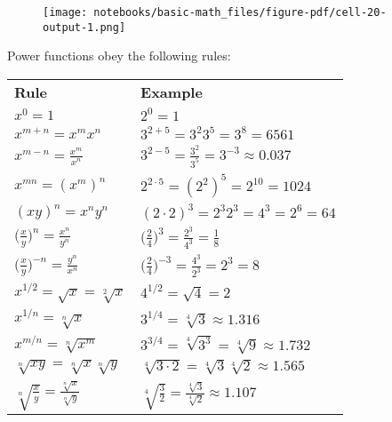 \documentclass[
  letterpaper,
  DIV=11,
  numbers=noendperiod]{scrreprt}
\newenvironment{Shaded}{\begin{snugshade}}{\end{snugshade}}
\newcommand{\DecValTok}[1]{\textcolor[rgb]{0.68,0.00,0.00}{#1}}
\newcommand{\FloatTok}[1]{\textcolor[rgb]{0.68,0.00,0.00}{#1}}
\newcommand{\KeywordTok}[1]{\textcolor[rgb]{0.00,0.23,0.31}{#1}}
\newcommand{\NormalTok}[1]{\textcolor[rgb]{0.00,0.23,0.31}{#1}}
\newcommand{\OperatorTok}[1]{\textcolor[rgb]{0.37,0.37,0.37}{#1}}
\newcommand{\SpecialCharTok}[1]{\textcolor[rgb]{0.37,0.37,0.37}{#1}}
\newcommand{\StringTok}[1]{\textcolor[rgb]{0.13,0.47,0.30}{#1}}
\begin{document}
\begin{Shaded}
\end{Shaded}

\begin{figure}[H]

{\centering \texttt{[image: notebooks/basic-math\_files/figure-pdf/cell-20-output-1.png]}

}

\end{figure}

Power functions obey the following rules:

\begin{longtable}[]{@{}
  >{\raggedright\arraybackslash}p{}
  >{\raggedright\arraybackslash}p{}@{}}
\toprule()
\endhead
\textbf{Rule} & \textbf{Example} \\
\(x^0 = 1\) & \(2^0 = 1\) \\
\(x^{m+n} = x^m x^n\) & \(3^{2+5} = 3^2 3^5 = 3^8 = 6561\) \\
\(x^{m-n} = \frac{x^m}{x^n}\) &
\(3^{2-5} = \frac{3^2}{3^5} = 3^{-3} \approx 0.037\) \\
\(x^{mn} = (x^m)^n\) & \(2^{2 \cdot 5} = (2^2)^5 = 2^{10} = 1024\) \\
\((xy)^n = x^n y^n\) & \((2 \cdot 2)^3 = 2^3 2^3 = 4^3 = 2^6 = 64\) \\
\(\big(\frac{x}{y}\big)^n = \frac{x^n}{y^n}\) &
\(\big(\frac{2}{4}\big)^3 = \frac{2^3}{4^3} = \frac{1}{8}\) \\
\(\big(\frac{x}{y}\big)^{-n} = \frac{y^n}{x^n}\) &
\(\big(\frac{2}{4}\big)^{-3} = \frac{4^3}{2^3} = 2^3 = 8\) \\
\(x^{1/2} = \sqrt{x} = \sqrt[2]{x}\) & \(4^{1/2} = \sqrt{4} = 2\) \\
\(x^{1/n} = \sqrt[n]{x}\) & \(3^{1/4} = \sqrt[4]{3} \approx 1.316\) \\
\(x^{m/n} = \sqrt[n]{x^m}\) &
\(3^{3/4} = \sqrt[4]{3^3} = \sqrt[4]{9} \approx 1.732\) \\
\(\sqrt[n]{xy} = \sqrt[n]{x} \sqrt[n]{y}\) &
\(\sqrt[4]{3 \cdot 2} = \sqrt[4]{3} \sqrt[4]{2} \approx 1.565\) \\
\(\sqrt[n]{\frac{x}{y}} = \frac{\sqrt[n]{x}}{\sqrt[n]{y}}\) &
\(\sqrt[4]{\frac{3}{2}} = \frac{\sqrt[4]{3}}{\sqrt[4]{2}} \approx 1.107\) \\
\bottomrule()
\end{longtable}
\end{document}
